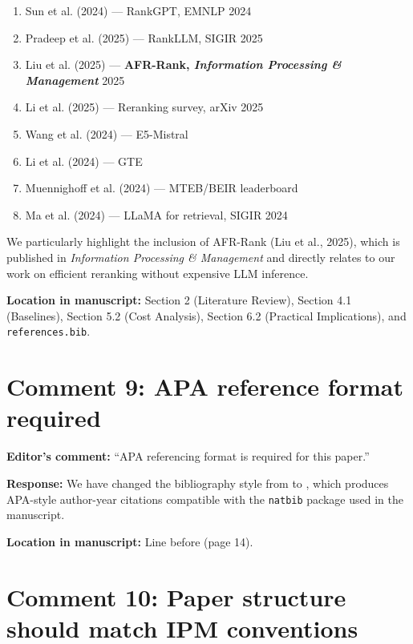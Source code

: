 \documentclass[11pt]{article}
\begin{document}
\begin{enumerate}[leftmargin=*]
\item Sun et al. (2024) --- RankGPT, EMNLP 2024
\item Pradeep et al. (2025) --- RankLLM, SIGIR 2025
\item Liu et al. (2025) --- \textbf{AFR-Rank, \textit{Information Processing \& Management}} 2025
\item Li et al. (2025) --- Reranking survey, arXiv 2025
\item Wang et al. (2024) --- E5-Mistral
\item Li et al. (2024) --- GTE
\item Muennighoff et al. (2024) --- MTEB/BEIR leaderboard
\item Ma et al. (2024) --- LLaMA for retrieval, SIGIR 2024
\end{enumerate}

We particularly highlight the inclusion of AFR-Rank (Liu et al., 2025), which is published in \textit{Information Processing \& Management} and directly relates to our work on efficient reranking without expensive LLM inference.

\textbf{Location in manuscript:} Section 2 (Literature Review), Section 4.1 (Baselines), Section 5.2 (Cost Analysis), Section 6.2 (Practical Implications), and \texttt{references.bib}.

\section*{Comment 9: APA reference format required}

\textbf{Editor's comment:} ``APA referencing format is required for this paper.''

\textbf{Response:} We have changed the bibliography style from \verb|| to \verb||, which produces APA-style author-year citations compatible with the \texttt{natbib} package used in the manuscript.

\textbf{Location in manuscript:} Line before \verb|| (page 14).

\section*{Comment 10: Paper structure should match IPM conventions}
\end{document}
